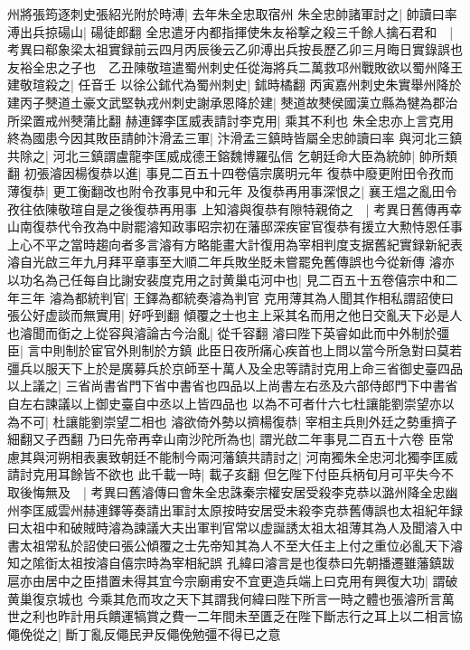 州將張筠逐刺史張紹光附於時溥|{
	去年朱全忠取宿州}
朱全忠帥諸軍討之|{
	帥讀曰率}
溥出兵掠碭山|{
	碭徒郎翻}
全忠遣牙内都指揮使朱友裕撃之殺三千餘人擒石君和　|{
	考異曰郗象梁太祖實録前云四月丙辰後云乙卯溥出兵按長歷乙卯三月晦日實錄誤也}
友裕全忠之子也　乙丑陳敬瑄遣蜀州刺史任從海將兵二萬救邛州戰敗欲以蜀州降王建敬瑄殺之|{
	任音壬}
以徐公鉥代為蜀州刺史|{
	鉥時橘翻}
丙寅嘉州刺史朱實舉州降於建丙子僰道土豪文武堅執戎州刺史謝承恩降於建|{
	僰道故僰侯國漢立縣為犍為郡治所梁置戒州僰蒲比翻}
赫連鐸李匡威表請討李克用|{
	乘其不利也}
朱全忠亦上言克用終為國患今因其敗臣請帥汴滑孟三軍|{
	汴滑孟三鎮時皆屬全忠帥讀曰率}
與河北三鎮共除之|{
	河北三鎮謂盧龍李匡威成德王鎔魏博羅弘信}
乞朝廷命大臣為統帥|{
	帥所類翻}
初張濬因楊復恭以進|{
	事見二百五十四卷僖宗廣明元年}
復恭中廢更附田令孜而薄復恭|{
	更工衡翻改也附令孜事見中和元年}
及復恭再用事深恨之|{
	襄王煴之亂田令孜往依陳敬瑄自是之後復恭再用事}
上知濬與復恭有隙特親倚之　|{
	考異日舊傳再幸山南復恭代令孜為中尉罷濬知政事昭宗初在藩邸深疾宦官復恭有援立大勲恃恩任事上心不平之當時趨向者多言濬有方略能畫大計復用為宰相判度支据舊紀實録新紀表濬自光啟三年九月拜平章事至大順二年兵敗坐貶未嘗罷免舊傳誤也今從新傳}
濬亦以功名為己任每自比謝安裴度克用之討黄巢屯河中也|{
	見二百五十五卷僖宗中和二年三年}
濬為都統判官|{
	王鐸為都統奏濬為判官}
克用薄其為人聞其作相私謂詔使曰張公好虚談而無實用|{
	好呼到翻}
傾覆之士也主上采其名而用之他日交亂天下必是人也濬聞而衘之上從容與濬論古今治亂|{
	從千容翻}
濬曰陛下英睿如此而中外制於彊臣|{
	言中則制於宦官外則制於方鎮}
此臣日夜所痛心疾首也上問以當今所急對曰莫若彊兵以服天下上於是廣募兵於京師至十萬人及全忠等請討克用上命三省御史臺四品以上議之|{
	三省尚書省門下省中書省也四品以上尚書左右丞及六部侍郎門下中書省自左右諫議以上御史臺自中丞以上皆四品也}
以為不可者什六七杜讓能劉崇望亦以為不可|{
	杜讓能劉崇望二相也}
濬欲倚外勢以擠楊復恭|{
	宰相主兵則外廷之勢重擠子細翻又子西翻}
乃曰先帝再幸山南沙陀所為也|{
	謂光啟二年事見二百五十六卷}
臣常慮其與河朔相表裏致朝廷不能制今兩河藩鎮共請討之|{
	河南獨朱全忠河北獨李匡威請討克用耳餘皆不欲也}
此千載一時|{
	載子亥翻}
但乞陛下付臣兵柄旬月可平失今不取後悔無及　|{
	考異曰舊濬傳曰會朱全忠誅秦宗權安居受殺李克恭以潞州降全忠幽州李匡威雲州赫連鐸等奏請出軍討太原按時安居受未殺李克恭舊傳誤也太祖紀年録曰太祖中和破賊時濬為諫議大夫出軍判官常以虚誕誘太祖太祖薄其為人及聞濬入中書太祖常私於詔使曰張公傾覆之士先帝知其為人不至大任主上付之重位必亂天下濬知之隂衘太祖按濬自僖宗時為宰相紀誤}
孔緯曰濬言是也復恭曰先朝播遷雖藩鎮跋扈亦由居中之臣措置未得其宜今宗廟甫安不宜更造兵端上曰克用有興復大功|{
	謂破黄巢復京城也}
今乘其危而攻之天下其謂我何緯曰陛下所言一時之體也張濬所言萬世之利也昨計用兵饋運犒賞之費一二年間未至匱乏在陛下斷志行之耳上以二相言協僶俛從之|{
	斷丁亂反僶民尹反僶俛勉彊不得已之意}
